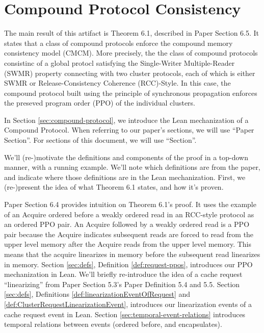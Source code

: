 \chapter{Compound Protocol Consistency}
\label{ch:proof-overview}

The main result of this artifact is Theorem 6.1, described in Paper Section 6.5.
It states that a class of compound protocols enforce the compound memory consistency model (CMCM).
More precisely, the the class of compound protocols consistinc of a global protocl satisfying the Single-Writer Multiple-Reader (SWMR) property 
connecting with two cluster protocols, each of which is either SWMR or Release-Consistency Coherence (RCC)-Style.
In this case, the compound protocol built using the principle of synchronous propagation enforces the preseved program order (PPO) of the individual clusters.

In Section \ref{sec:compound-protocol}, we introduce the Lean mechanization of a Compound Protocol.
When referring to our paper's sections, we will use ``Paper Section''.
For sections of this document, we will use ``Section''.

We'll (re-)motivate the definitions and components of the proof in a top-down manner, with a running example.
We'll note which definitions are from the paper, and indicate where those definitions are in the Lean mechanization.
First, we (re-)present the idea of what Theorem 6.1 states, and how it's proven.

Paper Section 6.4 provides intuition on Theorem 6.1's proof.
It uses the example of an Acquire ordered before a weakly ordered read in an RCC-style protocol as an ordered PPO pair.
An Acquire followed by a weakly ordered read is a PPO pair because the
Acquire indicates subsequent reads are forced to read from the upper level memory after the Acquire reads from the upper level memory.
This means that the acquire linearizes in memory before the subsequent read linearizes in memory.
Section \ref{sec:defs}, Definition \ref{def:request-ppos}, introduces our PPO mechanization in Lean.
We'll briefly re-introduce the idea of a cache request ``linearizing'' from Paper Section 5.3's Paper Definition 5.4 and 5.5.
Section \ref{sec:defs}, Definitions \ref{def:linearizationEventOfRequest}
and \ref{def:ClusterRequestLinearizationEvent}, introduces our linearization events of a cache request event in Lean.
Section \ref{sec:temporal-event-relations} introduces temporal relations between events (ordered before, and
encapsulates).

